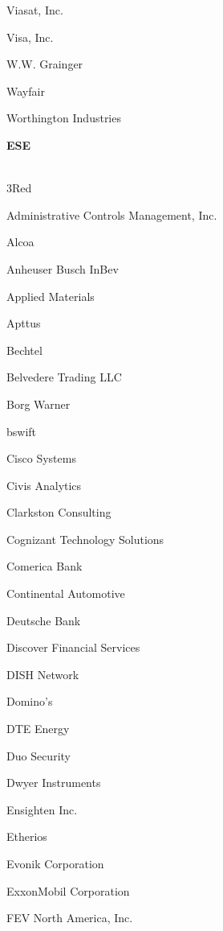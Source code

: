 \documentclass[twoside]{article}
\begin{document}
\begin{center}
\begin{multicols}{5}
\begin{FlushLeft}
\begin{compactitem}
\item Viasat, Inc.
\item Visa, Inc.
\item W.W. Grainger
\item Wayfair
\item Worthington Industries
\end{compactitem}
        \end{FlushLeft}
        \vspace{1em}
        {\fontsize{14}{16}\selectfont \bf ESE}\\
        \vspace{-1em}
        ~\hrulefill~
        \vspace{-.9em}
        \begin{FlushLeft}
        \begin{compactitem}
        \item 3Red
\item Administrative Controls Management, Inc.
\item Alcoa
\item Anheuser Busch InBev
\item Applied Materials
\item Apttus
\item Bechtel
\item Belvedere Trading LLC
\item Borg Warner
\item bswift
\item Cisco Systems
\item Civis Analytics
\item Clarkston Consulting
\item Cognizant Technology Solutions
\item Comerica Bank
\item Continental Automotive
\item Deutsche Bank
\item Discover Financial Services
\item DISH Network
\item Domino's
\item DTE Energy
\item Duo Security
\item Dwyer Instruments
\item Ensighten Inc.
\item Etherios
\item Evonik Corporation
\item ExxonMobil Corporation
\item FEV North America, Inc.

\end{compactitem}
\end{FlushLeft}
\end{multicols}
\end{center}
\end{document}

